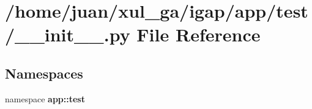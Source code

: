 \section{/home/juan/xul\_\-ga/igap/app/test/\_\-\_\-init\_\-\_\-.py File Reference}
\label{app_2test_2____init_____8py}
\subsection*{Namespaces}
\begin{CompactItemize}
\item 
namespace {\bf app::test}
\end{CompactItemize}
